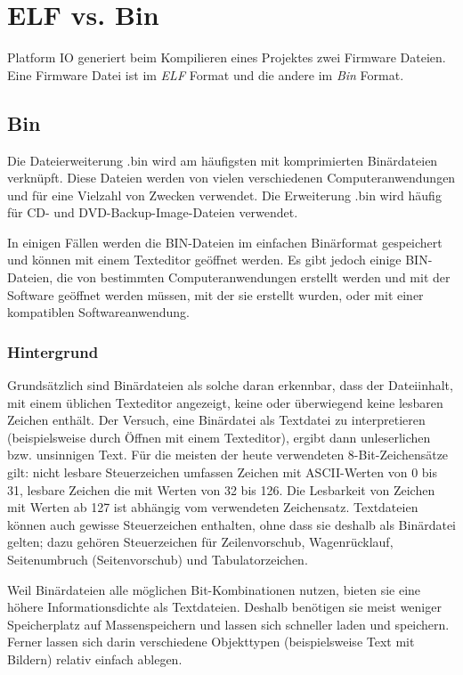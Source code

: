 \section{ELF vs. Bin}

Platform IO generiert beim Kompilieren eines Projektes zwei Firmware Dateien. 
Eine Firmware Datei ist im \textit{ELF} Format und die andere im \textit{Bin} Format.

\subsection{Bin}
Die Dateierweiterung .bin wird am häufigsten mit komprimierten Binärdateien verknüpft. Diese Dateien werden von vielen verschiedenen Computeranwendungen und für eine Vielzahl von Zwecken verwendet. Die Erweiterung .bin wird häufig für CD- und DVD-Backup-Image-Dateien verwendet.

In einigen Fällen werden die BIN-Dateien im einfachen Binärformat gespeichert und können mit einem Texteditor geöffnet werden. Es gibt jedoch einige BIN-Dateien, die von bestimmten Computeranwendungen erstellt werden und mit der Software geöffnet werden müssen, mit der sie erstellt wurden, oder mit einer kompatiblen Softwareanwendung.\cite{file.org_bin}

\subsubsection{Hintergrund}
Grundsätzlich sind Binärdateien als solche daran erkennbar, dass der Dateiinhalt, mit einem üblichen Texteditor angezeigt, keine oder überwiegend keine lesbaren Zeichen enthält. Der Versuch, eine Binärdatei als Textdatei zu interpretieren (beispielsweise durch Öffnen mit einem Texteditor), ergibt dann unleserlichen bzw. unsinnigen Text. Für die meisten der heute verwendeten 8-Bit-Zeichensätze gilt: nicht lesbare Steuerzeichen umfassen Zeichen mit ASCII-Werten von 0 bis 31, lesbare Zeichen die mit Werten von 32 bis 126. Die Lesbarkeit von Zeichen mit Werten ab 127 ist abhängig vom verwendeten Zeichensatz. Textdateien können auch gewisse Steuerzeichen enthalten, ohne dass sie deshalb als Binärdatei gelten; dazu gehören Steuerzeichen für Zeilenvorschub, Wagenrücklauf, Seitenumbruch (Seitenvorschub) und Tabulatorzeichen.

Weil Binärdateien alle möglichen Bit-Kombinationen nutzen, bieten sie eine höhere Informationsdichte als Textdateien. Deshalb benötigen sie meist weniger Speicherplatz auf Massenspeichern und lassen sich schneller laden und speichern. Ferner lassen sich darin verschiedene Objekttypen (beispielsweise Text mit Bildern) relativ einfach ablegen.

